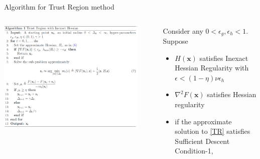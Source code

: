 \documentclass[10pt]{beamer}
\newcommand{\h}{\nabla^{2}}
\newcommand{\xbold}{\mathbf{x}}
\begin{document}
\begin{frame}{Algorithm for Trust Region method}
\begin{columns}
\centering
\includegraphics[width=0.9\textwidth]{./images/algo-1.png}
\begin{theorem}
Consider any \(0 < \epsilon_{g}, \epsilon_{h} < 1\). Suppose
\begin{itemize}
\item<1->{\(H(\xbold)\) satisfies Inexact Hessian Regularity with \(\epsilon < (1 - \eta)\nu\epsilon_{h}\)}
\item<2->{\(\h F(\xbold)\) satisfies Hessian regularity}
\item<3->{if the approximate solution to \ref{TR} satisfies Sufficient Descent Condition-1}, 
\end{itemize}
\end{theorem}
\end{columns}
\end{frame}
\end{document}
